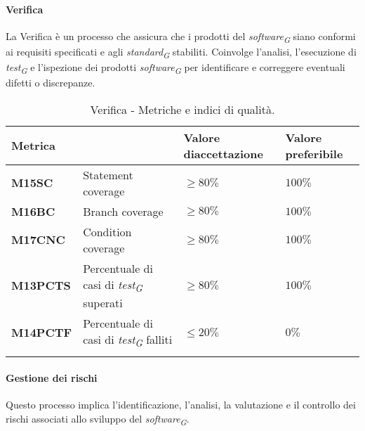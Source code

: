 \vspace{0.5cm}

\paragraph{Verifica}
La Verifica è un processo che assicura che i prodotti del \textit{software}\textsubscript{\textit{G}} siano conformi ai requisiti specificati e agli \textit{standard}\textsubscript{\textit{G}} stabiliti. Coinvolge l'analisi, l'esecuzione di \textit{test}\textsubscript{\textit{G}} e l'ispezione dei prodotti \textit{software}\textsubscript{\textit{G}} per identificare e correggere eventuali difetti o discrepanze.

\vspace{0.4cm}

\begin{longtable}{|C{1.9cm}|L{4cm}|L{2.2cm}|L{2.1cm}|}
    \hline
    \textbf{Metrica} &  & \textbf{Valore di\linebreak accettazione} & {\textbf{Valore \linebreak preferibile}} \\
    \hline \hline

    \textbf{M15SC} & Statement coverage & $\geq 80\%$ & $100\%$ \\
    \hline

    \textbf{M16BC} & Branch coverage & $\geq 80\%$ & $100\%$ \\
    \hline

    \textbf{M17CNC} & Condition coverage & $\geq 80\%$ & $100\%$ \\
    \hline

    \textbf{M13PCTS} & Percentuale di casi di \textit{test}\textsubscript{\textit{G}} superati & $\geq 80\%$ & $100\%$ \\
    \hline

    \textbf{M14PCTF} & Percentuale di casi di \textit{test}\textsubscript{\textit{G}} falliti & $\leq 20\%$ & $0\%$ \\
    \hline

\caption{Verifica - Metriche e indici di qualità.}
\label{tab:metriche_verifica}
\end{longtable}

\vspace{0.5cm}

\paragraph{Gestione dei rischi}
Questo processo implica l'identificazione, l'analisi, la valutazione e il controllo dei rischi associati allo sviluppo del \textit{software}\textsubscript{\textit{G}}. 

